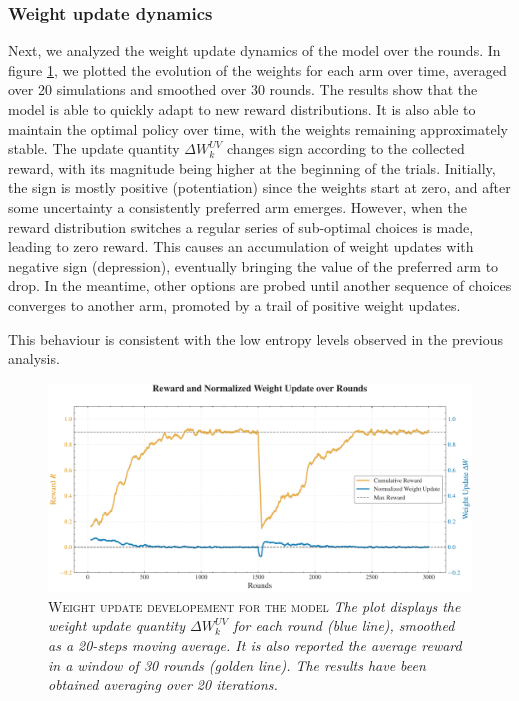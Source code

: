 \subsubsection{Weight update dynamics}
\noindent Next, we analyzed the weight update dynamics of the model over the rounds.
In figure \ref{fig:rew_update}, we plotted the evolution of the weights for each arm over time, averaged over 20 simulations and smoothed over 30 rounds.
The results show that the model is able to quickly adapt to new reward distributions. It is also able to maintain the optimal policy over time, with the weights remaining approximately stable.
The update quantity $\Delta W_{k}^{UV}$ changes sign according to the collected reward, with its magnitude being higher at the beginning of the trials.
Initially, the sign is mostly positive (potentiation) since the weights start at zero, and after some uncertainty a consistently preferred arm emerges.
However, when the reward distribution switches a regular series of sub-optimal choices is made, leading to zero reward.
This causes an accumulation of weight updates with negative sign (depression), eventually bringing the value of the preferred arm to drop. In the meantime, other options are probed until another sequence of choices converges to another arm, promoted by a trail of positive weight updates.

This behaviour is consistent with the low entropy levels observed in the previous analysis.


\begin{figure}[H]
    \centering
    \includegraphics[width=1.0\textwidth]{figures/reward_update_plot.pdf}
    \caption{\textsc{Weight update developement for the model} \textit{The plot displays the weight update quantity $\Delta W_{k}^{UV}$ for each round (blue line), smoothed as a 20-steps moving average.
    It is also reported the average reward in a window of 30 rounds (golden line). The results have been obtained averaging over 20 iterations.}}
    \label{fig:rew_update}
\end{figure}


